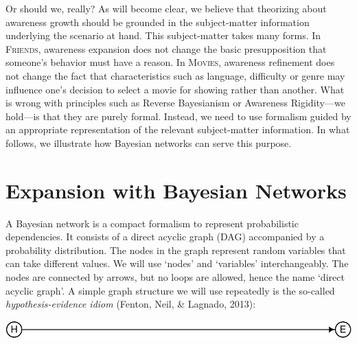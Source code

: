 \documentclass[
  11pt,
  dvipsnames,enabledeprecatedfontcommands, todos]{scrartcl}
\begin{document}
Or should we, really? As will become clear, we believe that theorizing
about awareness growth should be grounded in the subject-matter
information underlying the scenario at hand. This subject-matter takes
many forms. In \textsc{Friends}, awareness expansion does not change the
basic presupposition that someone's behavior must have a reason. In
\textsc{Movies}, awareness refinement does not change the fact that
characteristics such as language, difficulty or genre may influence
one's decision to select a movie for showing rather than another. What
is wrong with principles such as Reverse Bayesianism or Awareness
Rigidity---we hold---is that they are purely formal. Instead, we need to
use formalism guided by an appropriate representation of the relevant
subject-matter information. In what follows, we illustrate how Bayesian
networks can serve this purpose.

\hypertarget{expansion-with-bayesian-networks}{%
\section{Expansion with Bayesian
Networks}\label{expansion-with-bayesian-networks}}

\label{sec:expansion-networks}

A Bayesian network is a compact formalism to represent probabilistic
dependencies. It consists of a direct acyclic graph (DAG) accompanied by
a probability distribution. The nodes in the graph represent random
variables that can take different values. We will use `nodes' and
`variables' interchangeably. The nodes are connected by arrows, but no
loops are allowed, hence the name `direct acyclic graph'. A simple graph
structure we will use repeatedly is the so-called
\emph{hypothesis-evidence idiom} (Fenton, Neil, \& Lagnado, 2013):

\begin{center}\includegraphics[width=0.5\linewidth,height=0.5\textheight]{ReplyToSteeleStefansson5_files/figure-latex/heDAG-prel-1} \end{center}
\end{document}
